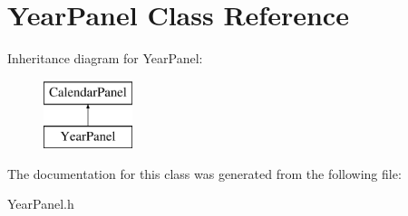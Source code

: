 \hypertarget{interface_year_panel}{\section{Year\+Panel Class Reference}
\label{interface_year_panel}
}
Inheritance diagram for Year\+Panel\+:\begin{figure}[H]
\begin{center}
\leavevmode
\includegraphics[height=2.000000cm]{interface_year_panel}
\end{center}
\end{figure}


The documentation for this class was generated from the following file\+:\begin{DoxyCompactItemize}
\item 
Year\+Panel.\+h\end{DoxyCompactItemize}
